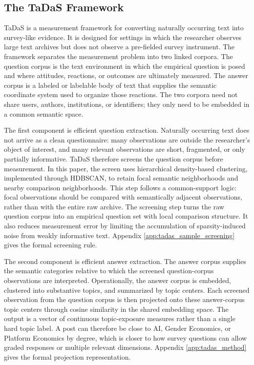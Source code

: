 \documentclass[11pt]{article}
\begin{document}
\subsection{The TaDaS Framework}

TaDaS is a measurement framework for converting naturally occurring text into survey-like evidence. It is designed for settings in which the researcher observes large text archives but does not observe a pre-fielded survey instrument. The framework separates the measurement problem into two linked corpora. The question corpus is the text environment in which the empirical question is posed and where attitudes, reactions, or outcomes are ultimately measured. The answer corpus is a labeled or labelable body of text that supplies the semantic coordinate system used to organize those reactions. The two corpora need not share users, authors, institutions, or identifiers; they only need to be embedded in a common semantic space.

The first component is efficient question extraction. Naturally occurring text does not arrive as a clean questionnaire: many observations are outside the researcher's object of interest, and many relevant observations are short, fragmented, or only partially informative. TaDaS therefore screens the question corpus before measurement. In this paper, the screen uses hierarchical density-based clustering, implemented through HDBSCAN, to retain focal semantic neighborhoods and nearby comparison neighborhoods. This step follows a common-support logic: focal observations should be compared with semantically adjacent observations, rather than with the entire raw archive. The screening step turns the raw question corpus into an empirical question set with local comparison structure. It also reduces measurement error by limiting the accumulation of sparsity-induced noise from weakly informative text. Appendix \ref{app:tadas_sample_screening} gives the formal screening rule.

The second component is efficient answer extraction. The answer corpus supplies the semantic categories relative to which the screened question-corpus observations are interpreted. Operationally, the answer corpus is embedded, clustered into substantive topics, and summarized by topic centers. Each screened observation from the question corpus is then projected onto these answer-corpus topic centers through cosine similarity in the shared embedding space. The output is a vector of continuous topic-exposure measures rather than a single hard topic label. A post can therefore be close to AI, Gender Economics, or Platform Economics by degree, which is closer to how survey questions can allow graded responses or multiple relevant dimensions. Appendix \ref{app:tadas_method} gives the formal projection representation.
\end{document}
